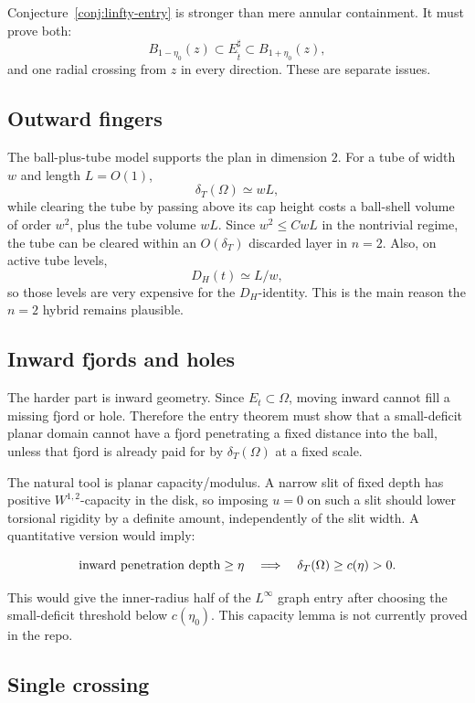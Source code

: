 \documentclass[11pt]{article}
\newcommand{\Om}{\Omega}
\newcommand{\dT}{\delta_T}
\begin{document}
Conjecture~\ref{conj:linfty-entry} is stronger than mere annular
containment.  It must prove both:
\[
   B_{1-\eta_0}(z)\subset E_{\hat t}^{\sharp}
      \subset B_{1+\eta_0}(z),
\]
and one radial crossing from \(z\) in every direction.  These are separate
issues.

\subsection{Outward fingers}

The ball-plus-tube model supports the plan in dimension \(2\).  For a tube
of width \(w\) and length \(L=O(1)\),
\[
   \dT(\Om)\simeq wL,
\]
while clearing the tube by passing above its cap height costs a ball-shell
volume of order \(w^2\), plus the tube volume \(wL\).  Since \(w^2\le CwL\)
in the nontrivial regime, the tube can be cleared within an \(O(\dT)\)
discarded layer in \(n=2\).  Also, on active tube levels,
\[
   D_H(t)\simeq L/w,
\]
so those levels are very expensive for the \(D_H\)-identity.  This is the
main reason the \(n=2\) hybrid remains plausible.

\subsection{Inward fjords and holes}

The harder part is inward geometry.  Since \(E_t\subset\Om\), moving inward
cannot fill a missing fjord or hole.  Therefore the entry theorem must show
that a small-deficit planar domain cannot have a fjord penetrating a fixed
distance into the ball, unless that fjord is already paid for by
\(\dT(\Om)\) at a fixed scale.

The natural tool is planar capacity/modulus.  A narrow slit of fixed depth
has positive \(W^{1,2}\)-capacity in the disk, so imposing \(u=0\) on such a
slit should lower torsional rigidity by a definite amount, independently of
the slit width.  A quantitative version would imply:

\[
   \hbox{inward penetration depth}\ge \eta
      \quad\Longrightarrow\quad
   \dT(\Om)\ge c(\eta)>0 .
\]

This would give the inner-radius half of the \(L^\infty\) graph entry after
choosing the small-deficit threshold below \(c(\eta_0)\).  This capacity
lemma is not currently proved in the repo.

\subsection{Single crossing}
\end{document}
